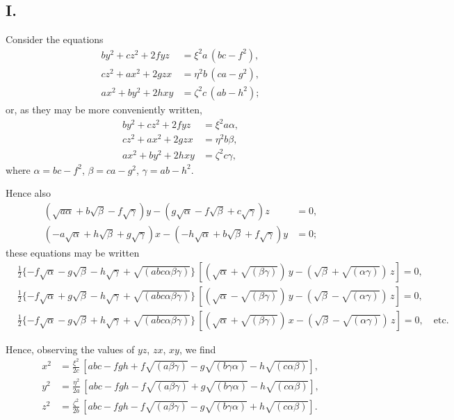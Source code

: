 \documentclass[11pt,a4paper]{book}
\begin{document}
\subsection*{I.}

Consider the equations
\begin{align*}
by^2 + cz^2 + 2fyz &= \xi^2a\,(bc - f^2), \\
cz^2 + ax^2 + 2gzx &= \eta^2b\,(ca - g^2), \\
ax^2 + by^2 + 2hxy &= \zeta^2c\,(ab - h^2);
\end{align*}
or, as they may be more conveniently written,
\begin{align*}
by^2 + cz^2 + 2fyz &= \xi^2a\alpha, \\
cz^2 + ax^2 + 2gzx &= \eta^2b\beta, \\
ax^2 + by^2 + 2hxy &= \zeta^2c\gamma,
\end{align*}
where $\alpha = bc - f^2$, $\beta = ca - g^2$, $\gamma = ab - h^2$.

Hence also
\begin{align*}
(\sqrt{a\alpha} + b\sqrt{\beta} - f\sqrt{\gamma})y - (g\sqrt{\alpha} - f\sqrt{\beta} + c\sqrt{\gamma})z &= 0, \\
(-a\sqrt{\alpha} + h\sqrt{\beta} + g\sqrt{\gamma})x - (-h\sqrt{\alpha} + b\sqrt{\beta} + f\sqrt{\gamma})y &= 0;
\end{align*}
these equations may be written
\begin{align*}
&\tfrac{1}{2}\{-f\sqrt{\alpha} - g\sqrt{\beta} - h\sqrt{\gamma} + \sqrt{(abc\alpha\beta\gamma)}\}\,[(\sqrt{\alpha} + \sqrt{(\beta\gamma)})\,y - (\sqrt{\beta} + \sqrt{(\alpha\gamma)})\,z] = 0, \\
&\tfrac{1}{2}\{-f\sqrt{\alpha} + g\sqrt{\beta} - h\sqrt{\gamma} + \sqrt{(abc\alpha\beta\gamma)}\}\,[(\sqrt{\alpha} - \sqrt{(\beta\gamma)})\,y - (\sqrt{\beta} - \sqrt{(\alpha\gamma)})\,z] = 0, \\
&\tfrac{1}{2}\{-f\sqrt{\alpha} - g\sqrt{\beta} + h\sqrt{\gamma} + \sqrt{(abc\alpha\beta\gamma)}\}\,[(\sqrt{\alpha} + \sqrt{(\beta\gamma)})\,x - (\sqrt{\beta} - \sqrt{(\alpha\gamma)})\,z] = 0, \quad \text{etc.}
\end{align*}

Hence, observing the values of $yz$, $zx$, $xy$, we find
\begin{align*}
x^2 &= \frac{\xi^2}{2c}\,[abc - fgh + f\sqrt{(a\beta\gamma)} - g\sqrt{(b\gamma\alpha)} - h\sqrt{(c\alpha\beta)}], \\
y^2 &= \frac{\eta^2}{2a}\,[abc - fgh - f\sqrt{(a\beta\gamma)} + g\sqrt{(b\gamma\alpha)} - h\sqrt{(c\alpha\beta)}], \\
z^2 &= \frac{\zeta^2}{2b}\,[abc - fgh - f\sqrt{(a\beta\gamma)} - g\sqrt{(b\gamma\alpha)} + h\sqrt{(c\alpha\beta)}].
\end{align*}
\end{document}
